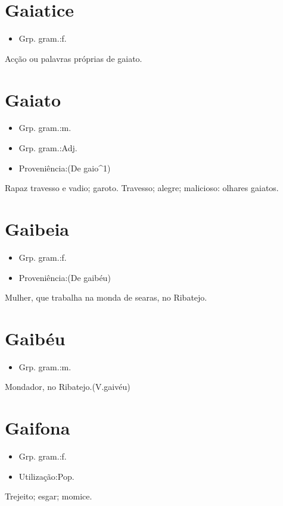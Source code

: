 \section{Gaiatice}
\begin{itemize}
\item {Grp. gram.:f.}
\end{itemize}
Acção ou palavras próprias de gaiato.
\section{Gaiato}
\begin{itemize}
\item {Grp. gram.:m.}
\end{itemize}
\begin{itemize}
\item {Grp. gram.:Adj.}
\end{itemize}
\begin{itemize}
\item {Proveniência:(De \textunderscore gaio\textunderscore ^1)}
\end{itemize}
Rapaz travesso e vadio; garoto.
Travesso; alegre; malicioso: \textunderscore olhares gaiatos\textunderscore .
\section{Gaibeia}
\begin{itemize}
\item {Grp. gram.:f.}
\end{itemize}
\begin{itemize}
\item {Proveniência:(De \textunderscore gaibéu\textunderscore )}
\end{itemize}
Mulher, que trabalha na monda de searas, no Ribatejo.
\section{Gaibéu}
\begin{itemize}
\item {Grp. gram.:m.}
\end{itemize}
Mondador, no Ribatejo.(V.gaivéu)
\section{Gaifona}
\begin{itemize}
\item {Grp. gram.:f.}
\end{itemize}
\begin{itemize}
\item {Utilização:Pop.}
\end{itemize}
Trejeito; esgar; momice.
